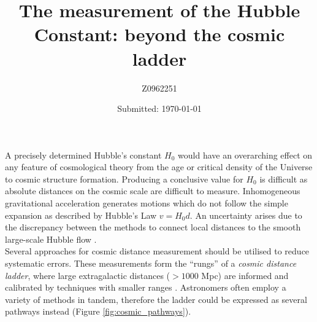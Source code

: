 \documentclass[12pt, onecolumn]{revtex4}    %
\begin{document}
                     


\title{The measurement of the Hubble Constant: beyond the cosmic ladder} 
\date{Submitted: \today{}}
\author{Z0962251}

\maketitle
\thispagestyle{plain} %

A precisely determined Hubble's constant $H_0$ would have an overarching effect on any feature of cosmological theory from the age or critical density of the Universe to cosmic structure formation. Producing a conclusive value for $H_0$ is difficult as absolute distances on the cosmic scale are difficult to measure. Inhomogeneous gravitational acceleration generates motions which do not follow the simple expansion as described by Hubble's Law $v=H_0 d$. An uncertainty arises due to the discrepancy between the methods to connect local distances to the smooth large-scale Hubble flow \citep{fukugita_cosmic}. \\

Several approaches for cosmic distance measurement should be utilised to reduce systematic errors. These measurements form the ``rungs'' of a \textit{cosmic distance ladder}, where large extragalactic distances ($>1000$ Mpc) are informed and calibrated by techniques with smaller ranges \citep{carroll_astro}. Astronomers often employ a variety of methods in tandem, therefore the ladder could be expressed as several pathways instead (Figure \ref{fig:cosmic_pathways}). 

\end{document}

